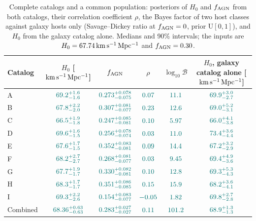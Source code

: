 \documentclass[aps,prd,reprint,twocolumn,superscriptaddress,nofootinbib,floatfix]{revtex4-2}
\newcommand{\kms}{{\rm km\,s^{-1}\,Mpc^{-1}}}
\newcommand{\fagn}{f_{\rm AGN}}
\newcommand{\lB}{\log_{10}\mathcal{B}}
\begin{document}
\begin{table}
\caption{Complete catalogs and a common population: posteriors of $H_0$ and
$\fagn$ from both catalogs, their correlation coefficient $\rho$, the Bayes
factor of two host classes against galaxy hosts only (Savage--Dickey ratio at
$\fagn=0$, prior U$[0,1]$), and $H_0$ from the galaxy catalog alone. Medians
and 90\% intervals; the inputs are $H_0=\MockHzero\,\kms$ and
$\fagn=\MockfAGN$.}
\label{tab:two}
\begin{ruledtabular}
\begin{tabular}{lccccc}
Catalog & $H_0$ [$\kms$] & $\fagn$ & $\rho$ & $\lB$ & $H_0$, galaxy catalog alone [$\kms$]\\
\hline
A & $\JointHzeroCatA$ & $\JointfCatA$ & $\JointRhoCatA$ & $\LBfZeroCatA$ & $\GalOnlyHzeroCatA$\\
B & $\JointHzeroCatB$ & $\JointfCatB$ & $\JointRhoCatB$ & $\LBfZeroCatB$ & $\GalOnlyHzeroCatB$\\
C & $\JointHzeroCatC$ & $\JointfCatC$ & $\JointRhoCatC$ & $\LBfZeroCatC$ & $\GalOnlyHzeroCatC$\\
D & $\JointHzeroCatD$ & $\JointfCatD$ & $\JointRhoCatD$ & $\LBfZeroCatD$ & $\GalOnlyHzeroCatD$\\
E & $\JointHzeroCatE$ & $\JointfCatE$ & $\JointRhoCatE$ & $\LBfZeroCatE$ & $\GalOnlyHzeroCatE$\\
F & $\JointHzeroCatF$ & $\JointfCatF$ & $\JointRhoCatF$ & $\LBfZeroCatF$ & $\GalOnlyHzeroCatF$\\
G & $\JointHzeroCatG$ & $\JointfCatG$ & $\JointRhoCatG$ & $\LBfZeroCatG$ & $\GalOnlyHzeroCatG$\\
H & $\JointHzeroCatH$ & $\JointfCatH$ & $\JointRhoCatH$ & $\LBfZeroCatH$ & $\GalOnlyHzeroCatH$\\
I & $\JointHzeroCatI$ & $\JointfCatI$ & $\JointRhoCatI$ & $\LBfZeroCatI$ & $\GalOnlyHzeroCatI$\\
\hline
Combined & $\JointHzeroComb$ & $\JointfComb$ & $\JointRhoComb$ & $\LBfZeroComb$ & $\GalOnlyHzeroComb$\\
\end{tabular}
\end{ruledtabular}
\end{table}
\end{document}
